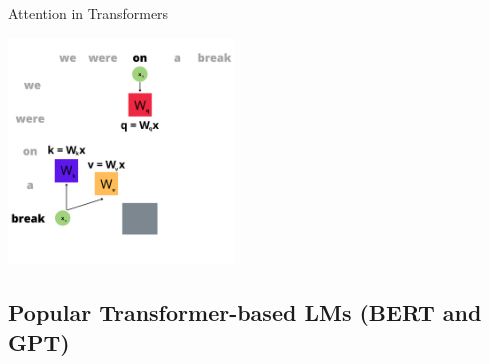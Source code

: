 \documentclass[9pt]{beamer}
\begin{document}
\begin{frame}{Attention in Transformers}
{\begin{textblock}{0.5}
        \includegraphics[width = 6cm]{img/self_attn3.png}
\end{textblock}}
\end{frame}
\fi

\subsection{Popular Transformer-based LMs (BERT and GPT)}
\end{document}
